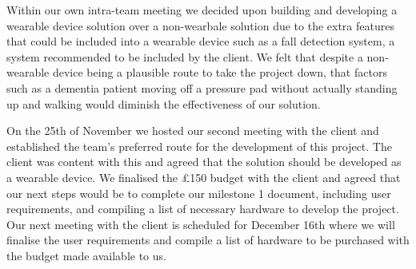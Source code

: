     Within our own intra-team meeting we decided upon building and developing a wearable device solution over a non-wearbale solution due to the extra features that could be included into a wearable device such as a fall detection system, a system recommended to be included by the client. We felt that despite a non-wearable device being a plausible route to take the project down, that factors such as a dementia patient moving off a pressure pad without actually standing up and walking would diminish the effectiveness of our solution.

    On the 25th of November we hosted our second meeting with the client and established the team's preferred route for the development of this project. The client was content with this and agreed that the solution should be developed as a wearable device. We finalised the £150 budget with the client and agreed that our next steps would be to complete our milestone 1 document, including user requirements, and compiling a list of necessary hardware to develop the project. Our next meeting with the client is scheduled for December 16th where we will finalise the user requirements and compile a list of hardware to be purchased with the budget made available to us.
